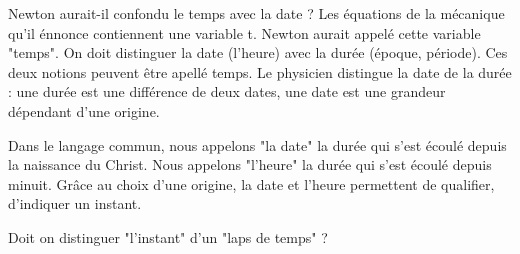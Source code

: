 Newton aurait-il confondu le temps avec la date ? Les équations de la mécanique qu'il énnonce contiennent une variable t. Newton aurait appelé cette variable "temps". On doit distinguer la date (l'heure) avec la durée (époque, période). Ces deux notions peuvent être apellé temps. Le physicien distingue la date de la durée : une durée est une différence de deux dates, une date est une grandeur dépendant d'une origine.

Dans le langage commun, nous appelons "la date" la durée qui s'est écoulé depuis la naissance du Christ. Nous appelons "l'heure" la durée qui s'est écoulé depuis minuit. Grâce au choix d'une origine, la date et l'heure permettent de qualifier, d'indiquer un instant. 

Doit on distinguer "l'instant" d'un "laps de temps" ? 
